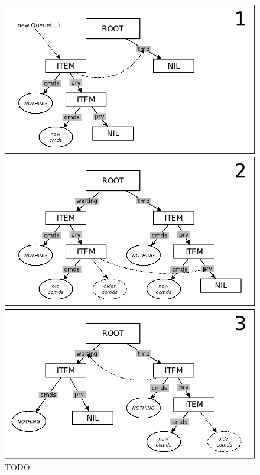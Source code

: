 \documentclass{acm_proc_article-sp}
\begin{document}
\begin{figure}%
\begin{minipage}[t]{0.33\linewidth}
\centering
\includegraphics[scale=0.20]{queue-31.png}
\end{minipage}
\begin{minipage}[t]{0.33\linewidth}
\centering
\includegraphics[scale=0.20]{queue-32.png}
\end{minipage}
\begin{minipage}[t]{0.33\linewidth}
\centering
\includegraphics[scale=0.20]{queue-33.png}
\end{minipage}
\caption{
TODO
\label{fig.queue-3}
}
\end{figure}
\end{document}
